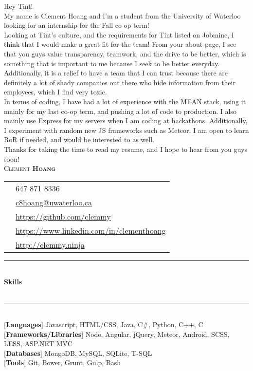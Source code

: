 \documentclass[10pt]{article}
\newcommand{\cvtitle}[4] {%
	{\LARGE\color{#2}\textsc{#1}}\hspace{\stretch{3}}{\large \textbf{#3}}\\[#4]}
\newcommand{\positionedbox}[3]{%
	\begin{minipage}{#2}
		\begin{flush#1}
			#3
		\end{flush#1}
	\end{minipage}}
\newcommand{\cvsectiontitle}[1]{%
	\rule{\linewidth}{0.2mm}\\%
		{\large\indent\textbf{#1}}\\%
	\\[-6.5mm]\rule{\linewidth}{0.2mm}\\[2mm]%
	}
\begin{document}
Hey Tint! \\

My name is Clement Hoang and I'm a student from the University of Waterloo looking for an internship for the Fall co-op term! \\

Looking at Tint's culture, and the requirements for Tint listed on Jobmine, I think that I would make a great fit for the team! From your about page, I see that you guys value transparency, teamwork, and the drive to be better, which is something that is important to me because I seek to be better everyday. Additionally, it is a relief to have a team that I can trust because there are definitely a lot of shady companies out there who hide information from their employees, which I find very toxic. \\

In terms of coding, I have had a lot of experience with the MEAN stack, using it mainly for my last co-op term, and pushing a lot of code to production. I also mainly use Express for my servers when I am coding at hackathons. Additionally, I experiment with random new JS frameworks such as Meteor. I am open to learn RoR if needed, and would be interested to as well. \\

Thanks for taking the time to read my resume, and I hope to hear from you guys soon!\\


\cvtitle{Clement \textbf{Hoang}}{BrickRed}{}{0.3cm}
\positionedbox{left}{0.7\textwidth}{
	\begin{tabular}{ c l }
		{\FA \faPhone} & 647 871 8336 \\
		{\FA \faEnvelope} & \href{mailto:c8hoang@uwaterloo.ca}{c8hoang@uwaterloo.ca} \\
		{\FA \faGithub} & \href{https://github.com/clemmy}{https://github.com/clemmy} \\
		{\FA \faLinkedIn} & \href{https://www.linkedin.com/in/clementhoang}{https://www.linkedin.com/in/clementhoang} \\
		{\FA \faFire} & \href{http://clemmy.ninja}{http://clemmy.ninja}
	\end{tabular}
}
\vspace{0.2cm}

\cvsectiontitle{Skills}
[\textbf{Languages}] Javascript, HTML/CSS, Java, C\#, Python, C++, C \\[0.2cm]
[\textbf{Frameworks/Libraries}] Node, Angular, jQuery, Meteor, Android, SCSS, LESS, ASP.NET MVC \\[0.2cm]
[\textbf{Databases}] MongoDB, MySQL, SQLite, T-SQL \\[0.2cm]
[\textbf{Tools}] Git, Bower, Grunt, Gulp, Bash
\end{document}
